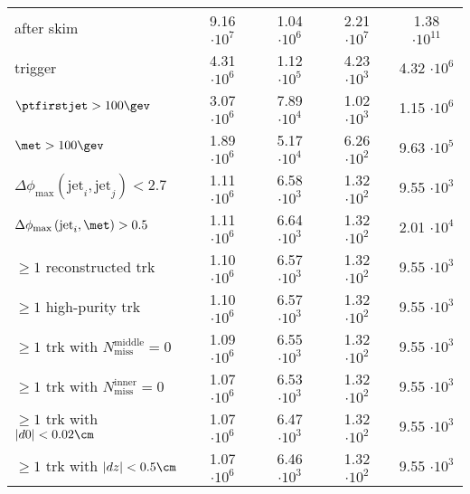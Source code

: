 \begin{table}[!h]
{\begin{tabular}{|l|c|c|c|c|}
after skim                                                                                & 9.16 $\cdot10^{7 }$ & 1.04 $\cdot10^{6 }$ & 2.21 $\cdot10^{7 }$ & 1.38 $\cdot10^{11}$ \\
trigger                                                                                   & 4.31 $\cdot10^{6 }$ & 1.12 $\cdot10^{5 }$ & 4.23 $\cdot10^{3 }$ & 4.32 $\cdot10^{6 }$ \\
$\ptfirstjet>100\gev$                                                                     & 3.07 $\cdot10^{6 }$ & 7.89 $\cdot10^{4 }$ & 1.02 $\cdot10^{3 }$ & 1.15 $\cdot10^{6 }$ \\
$\met>100\gev$                                                                            & 1.89 $\cdot10^{6 }$ & 5.17 $\cdot10^{4 }$ & 6.26 $\cdot10^{2 }$ & 9.63 $\cdot10^{5 }$ \\
$\Delta\phi_{\text{max}} \left( \text{jet}_i, \text{jet}_j  \right)<2.7$                  & 1.11 $\cdot10^{6 }$ & 6.58 $\cdot10^{3 }$ & 1.32 $\cdot10^{2 }$ & 9.55 $\cdot10^{3 }$ \\
$\Delta\phi_{\text{max}} \left( \text{jet}_i, \met  \right)>0.5$                          & 1.11 $\cdot10^{6 }$ & 6.64 $\cdot10^{3 }$ & 1.32 $\cdot10^{2 }$ & 2.01 $\cdot10^{4 }$ \\
$\geq1$ reconstructed trk                                                                 & 1.10 $\cdot10^{6 }$ & 6.57 $\cdot10^{3 }$ & 1.32 $\cdot10^{2 }$ & 9.55 $\cdot10^{3 }$ \\
$\geq1$ high-purity trk                                                                   & 1.10 $\cdot10^{6 }$ & 6.57 $\cdot10^{3 }$ & 1.32 $\cdot10^{2 }$ & 9.55 $\cdot10^{3 }$ \\
$\geq1$ trk with $N_{\text{miss}}^{\text{middle}}=0$                                      & 1.09 $\cdot10^{6 }$ & 6.55 $\cdot10^{3 }$ & 1.32 $\cdot10^{2 }$ & 9.55 $\cdot10^{3 }$ \\
$\geq1$ trk with $N_{\text{miss}}^{\text{inner}}=0$                                       & 1.07 $\cdot10^{6 }$ & 6.53 $\cdot10^{3 }$ & 1.32 $\cdot10^{2 }$ & 9.55 $\cdot10^{3 }$ \\
$\geq1$ trk with $|d0|<0.02\cm$                                                           & 1.07 $\cdot10^{6 }$ & 6.47 $\cdot10^{3 }$ & 1.32 $\cdot10^{2 }$ & 9.55 $\cdot10^{3 }$ \\
$\geq1$ trk with $|dz|<0.5\cm$                                                            & 1.07 $\cdot10^{6 }$ & 6.46 $\cdot10^{3 }$ & 1.32 $\cdot10^{2 }$ & 9.55 $\cdot10^{3 }$ \\

\end{tabular}}
\end{table}
